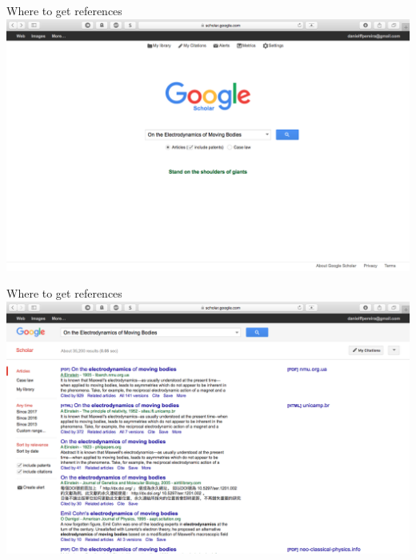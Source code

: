 \documentclass[usenames,dvipsnames,aspectratio=169]{beamer}
\begin{document}

\begin{frame}[t]{Where to get references}
\includegraphics[trim={0 10cm 0 0}, clip=true, width=\linewidth]{biblio1.png}
\end{frame}

\begin{frame}[t]{Where to get references}
\includegraphics[trim={0 10cm 0 0}, clip=true, width=\linewidth]{biblio2.png}
\end{frame}
\end{document}
